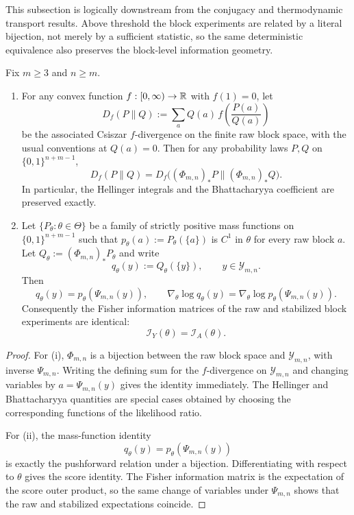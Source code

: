 This subsection is logically downstream from the conjugacy and thermodynamic transport results. Above threshold the block experiments are related by a literal bijection, not merely by a sufficient statistic, so the same deterministic equivalence also preserves the block-level information geometry.

\begin{corollary}\label{cor:info-geometry}
Fix $m\ge 3$ and $n\ge m$.
\begin{enumerate}[label=(\roman*),leftmargin=*,itemsep=2pt]
  \item For any convex function $f:[0,\infty)\to\mathbb{R}$ with $f(1)=0$, let
  \[
  D_f(P\|Q):=\sum_a Q(a)\,f\!\left(\frac{P(a)}{Q(a)}\right)
  \]
  be the associated Csiszar $f$-divergence on the finite raw block space, with the usual conventions at $Q(a)=0$. Then for any probability laws $P,Q$ on $\{0,1\}^{n+m-1}$,
  \[
  D_f(P\|Q)=D_f\bigl((\Phi_{m,n})_*P\|(\Phi_{m,n})_*Q\bigr).
  \]
  In particular, the Hellinger integrals and the Bhattacharyya coefficient are preserved exactly.
  \item Let $\{P_\theta:\theta\in\Theta\}$ be a family of strictly positive mass functions on $\{0,1\}^{n+m-1}$ such that $p_\theta(a):=P_\theta(\{a\})$ is $C^1$ in $\theta$ for every raw block $a$. Let $Q_\theta:=(\Phi_{m,n})_*P_\theta$ and write
  \[
  q_\theta(y):=Q_\theta(\{y\}),
  \qquad y\in\mathcal Y_{m,n}.
  \]
  Then
  \[
  q_\theta(y)=p_\theta(\Psi_{m,n}(y)),
  \qquad
  \nabla_\theta \log q_\theta(y)=\nabla_\theta \log p_\theta(\Psi_{m,n}(y)).
  \]
  Consequently the Fisher information matrices of the raw and stabilized block experiments are identical:
  \[
  \mathcal I_Y(\theta)=\mathcal I_A(\theta).
  \]
\end{enumerate}
\end{corollary}

\begin{proof}
For (i), $\Phi_{m,n}$ is a bijection between the raw block space and $\mathcal Y_{m,n}$, with inverse $\Psi_{m,n}$. Writing the defining sum for the $f$-divergence on $\mathcal Y_{m,n}$ and changing variables by $a=\Psi_{m,n}(y)$ gives the identity immediately. The Hellinger and Bhattacharyya quantities are special cases obtained by choosing the corresponding functions of the likelihood ratio.

For (ii), the mass-function identity
\[
q_\theta(y)=p_\theta(\Psi_{m,n}(y))
\]
is exactly the pushforward relation under a bijection. Differentiating with respect to $\theta$ gives the score identity. The Fisher information matrix is the expectation of the score outer product, so the same change of variables under $\Psi_{m,n}$ shows that the raw and stabilized expectations coincide.
\end{proof}


